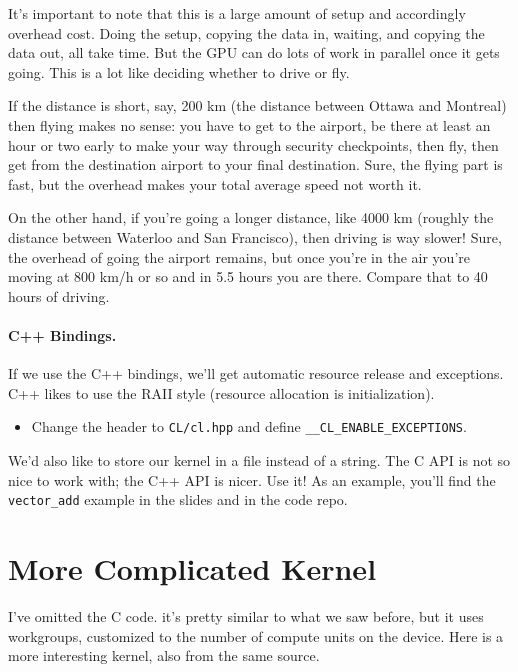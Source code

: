 \documentclass[a4paper]{report}
\begin{document}
It's important to note that this is a large amount of setup and accordingly overhead cost. Doing the setup, copying the data in, waiting, and copying the data out, all take time. But the GPU can do lots of work in parallel once it gets going. This is a lot like deciding whether to drive or fly. 

If the distance is short, say, 200 km (the distance between Ottawa and Montreal) then flying makes no sense: you have to get to the airport, be there at least an hour or two early to make your way through security checkpoints, then fly, then get from the destination airport to your final destination. Sure, the flying part is fast, but the overhead makes your total average speed not worth it.

On the other hand, if you're going a longer distance, like 4000 km (roughly the distance between Waterloo and San Francisco), then driving is way slower! Sure, the overhead of going the airport remains, but once you're in the air you're moving at 800 km/h or so and in 5.5 hours you are there. Compare that to 40 hours of driving.

\paragraph{C++ Bindings.}
    If we use the C++ bindings, we'll get automatic resource release and
      exceptions.
 C++ likes to use the RAII style
          (resource allocation is initialization).

\begin{itemize}
\item    Change the header to {\tt CL/cl.hpp} and define
      {\tt \_\_CL\_ENABLE\_EXCEPTIONS}.
\end{itemize}

We'd also like to store our kernel in a file instead of a string.
The C API is not so nice to work with; the C++ API is nicer. Use it!
As an example, you'll find the {\tt vector\_add} example in the slides and
in the code repo. 


\section*{More Complicated Kernel}
I've omitted the C code. it's pretty similar to what we saw
before, but it uses workgroups, customized to the number of
compute units on the device.  Here is a more interesting kernel, also from the same source.
\end{document}
